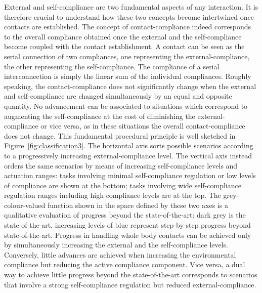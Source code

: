 \documentclass[final,5p,twocolumn]{elsarticle}
\begin{document}
External and self-compliance are two fundamental aspects of any interaction. It is therefore crucial to understand how these two concepts become intertwined once contacts are established. The concept of contact-compliance indeed corresponds to the overall compliance obtained once the external and the self-compliance become coupled with the contact establishment. A contact can be seen as the serial connection of two compliances, one representing the external-compliance, the other representing the self-compliance. The compliance of a serial interconnection is simply the linear sum of the individual compliances. Roughly speaking, the contact-compliance does not significantly change when the external and self-compliance are changed simultaneously by an equal and opposite quantity. No advancement can be associated to situations which correspond to augmenting the self-compliance at the cost of diminishing the external-compliance or vice versa, as in these situations the overall contact-compliance does not change. This fundamental procedural principle is well sketched in Figure~\ref{fig:classification3}. The horizontal axis sorts possible scenarios according to a progressively increasing external-compliance level. The vertical axis instead orders the same scenarios by means of increasing self-compliance levels and actuation ranges: tasks involving minimal self-compliance regulation or low levels of compliance are shown at the bottom; tasks involving wide self-compliance regulation ranges including high compliance levels are at the top. The grey-colour-valued function shown in the space defined by these two axes is a qualitative evaluation of progress beyond the state-of-the-art: dark grey is the state-of-the-art, increasing levels of blue represent step-by-step progress beyond state-of-the-art. Progress in handling whole body contacts can be achieved only by simultaneously increasing the external and the self-compliance levels. Conversely, little advances are achieved when increasing the environmental compliance but reducing the active compliance component. Vice versa, a dual way to achieve little progress beyond the state-of-the-art corresponds to scenarios that involve a strong self-compliance regulation but reduced external-compliance.  
\end{document}
